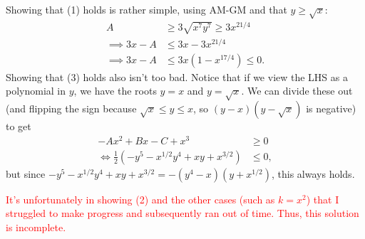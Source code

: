 \begin{solution}{4}
    Showing that (1) holds is rather simple, using AM-GM and that \( y \geq \sqrt{x} \):
    \begin{align*}
        A &\geq 3 \sqrt{x^7 y^7} \geq 3 x^{21/4} \\
        \implies 3x-A &\leq 3x-3x^{21/4} \\
        \implies 3x - A &\leq 3x(1 - x^{17/4}) \leq 0
    .\end{align*}
    Showing that (3) holds also isn't too bad. Notice that if we view the LHS as a polynomial in \( y \), we have the roots \( y = x \) and \( y = \sqrt{x} \). We can divide these out (and flipping the sign because \( \sqrt{x} \leq y \leq x \), so \( (y - x)(y - \sqrt{x}) \) is negative) to get
    \begin{align*}
        -Ax^2 + Bx - C + x^3 &\geq 0 \\
        \iff \frac{1}{2} \left( -y^5 - x^{1/2} y^4 + xy + x^{3/2} \right) &\leq 0
    ,\end{align*}
    but since \( -y^5 - x^{1/2} y^4 + xy + x^{3/2} = -(y^4 - x)(y + x^{1/2}) \), this always holds.

    \textcolor{red}{It's unfortunately in showing (2) and the other cases (such as \( k = x^2 \)) that I struggled to make progress and subsequently ran out of time. Thus, this solution is incomplete.}
\end{solution}

